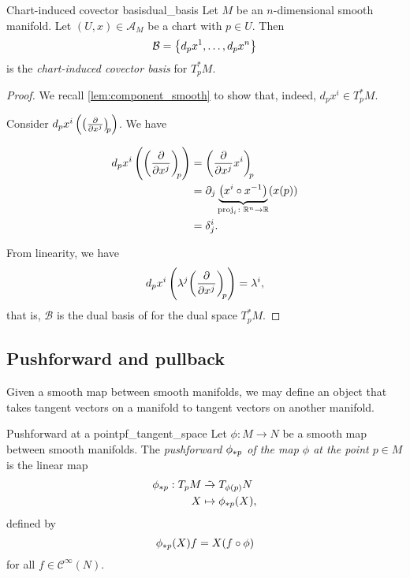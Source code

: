 \begin{theorem}{Chart-induced covector basis}{dual_basis}
    Let \(M\) be an \(n\)-dimensional smooth manifold. Let \((U, x) \in \mathscr{A}_M\) be a chart with \(p \in U\). Then
    \begin{equation*}
        \mathcal{B} = \set*{d_p x^1, \dots, d_p x^n}
    \end{equation*}
    is the \emph{chart-induced covector basis} for \(T_p ^{\ast} M\).
\end{theorem}
\begin{proof}
    We recall \cref{lem:component_smooth} to show that, indeed, \(d_p x^i \in T_p ^{\ast} M\).

    Consider \(d_p x^i \left(\bvec{x^j}{p}\right)\). We have

    \begin{align*}
        d_p x^i \left(\bvec{x^j}{p}\right) &= \bvec[x^i]{x^j}{p}\\
                                           &= \partial_j \underbrace{\left(x^i \circ x^{-1}\right)}_{\mathrm{proj}_i \colon \mathbb{R}^n \to \mathbb{R}}(x(p))\\
                                           &= \delta_j^i.
    \end{align*}

    From linearity, we have
    \begin{equation*}
        d_px^i\left(\lambda^j \bvec{x^j}{p}\right) = \lambda^i,
    \end{equation*}
    that is, \(\mathcal{B}\) is the dual basis of  for the dual space \(T_p ^{\ast}M\).
\end{proof}

\subsection{Pushforward and pullback}

Given a smooth map between smooth manifolds, we may define an object that takes tangent vectors on a manifold to tangent vectors on another manifold.

\begin{definition}{Pushforward at a point}{pf_tangent_space}
    Let \(\phi : M \to N\) be a smooth map between smooth manifolds. The \emph{pushforward \(\pf[p]\phi\) of the map \(\phi\) at the point \(p \in M\)} is the linear map
    \begin{align*}
        \pf[p]\phi : T_pM &\linear T_{\phi(p)}N\\
                        X &\mapsto \pf[p]\phi(X),
    \end{align*}
    defined by
    \begin{equation*}
        \pf[p]{\phi}(X)f = X(f \circ \phi)
    \end{equation*}
    for all \(f \in \mathcal{C}^\infty(N).\)
\end{definition}

